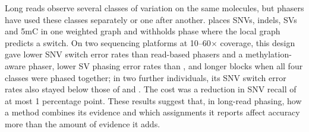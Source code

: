 %





Long reads observe several classes of variation on the same molecules, but phasers have used these classes separately or one after another. \toolname places SNVs, indels, SVs and 5mC in one weighted graph and withholds phase where the local graph predicts a switch. On two sequencing platforms at 10--60$\times$ coverage, this design gave lower SNV switch error rates than read-based phasers and a methylation-aware phaser, lower SV phasing error rates than \whatshap, and longer blocks when all four classes were phased together; in two further individuals, its SNV switch error rates also stayed below those of \whatshap and \hapcut. The cost was a reduction in SNV recall of at most 1 percentage point. These results suggest that, in long-read phasing, how a method combines its evidence and which assignments it reports affect accuracy more than the amount of evidence it adds.

